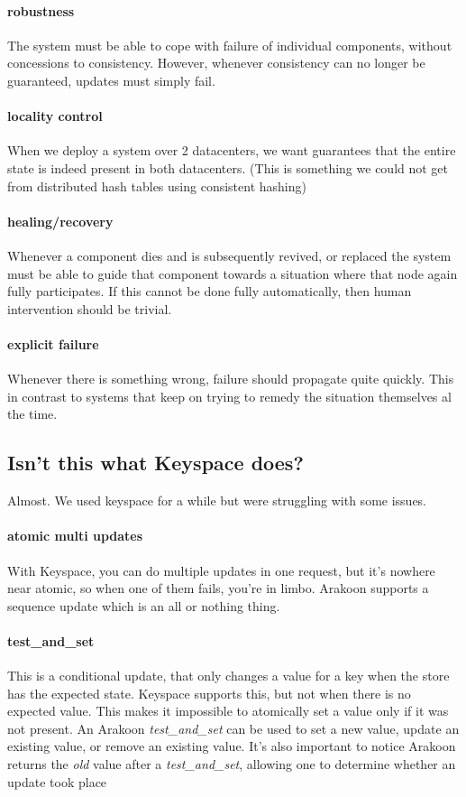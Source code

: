 \paragraph{robustness}
The system must be able to cope with failure of individual components, without concessions to consistency.
However, whenever consistency can no longer be guaranteed, updates must simply fail.
\paragraph{locality control}
When we deploy a system over 2 datacenters, we want guarantees that the entire state is indeed present in both datacenters. (This is something we could not get from distributed hash tables using consistent hashing)

\paragraph{healing/recovery}
Whenever a component dies and is subsequently revived, or replaced the system must be able to guide that component towards a situation where that node again fully participates. 
If this cannot be done fully automatically, then human intervention should be trivial.
\paragraph{explicit failure}
Whenever there is something wrong, failure should propagate quite quickly.
This in contrast to systems that keep on trying to remedy the situation themselves al the time.
\subsection{Isn't this what Keyspace does?}
Almost. We used keyspace for a while but were struggling with some issues.

\paragraph{atomic multi updates}
With Keyspace, you can do multiple updates in one request, 
but it's nowhere near atomic, so when one of them fails, you're in limbo. Arakoon supports a sequence update which is an all or nothing thing.
\paragraph{test\_and\_set}
This is a conditional update, that only changes a value for a key when the store has the expected state.
Keyspace supports this, but not when there is no expected value. 
This makes it impossible to atomically set a value only if it was not present.
An Arakoon \emph{test\_and\_set} can be used to set a new value, 
update an existing value, or remove an existing value.
It's also important to notice Arakoon returns the \emph{old} value after a
\emph{test\_and\_set}, allowing one to determine whether an update took place
